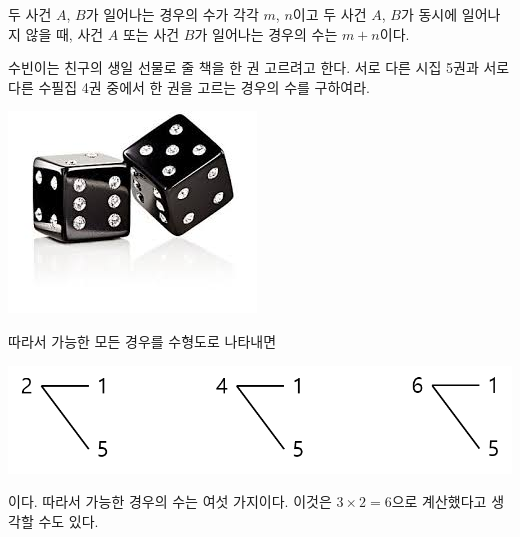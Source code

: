 \documentclass{oblivoir}
\begin{document}
\begin{mdframed}
%
\label{law2}
\hspace{-.7em}
두 사건 \(A\), \(B\)가 일어나는 경우의 수가 각각 \(m\), \(n\)이고 두 사건 \(A\), \(B\)가 동시에 일어나지 않을 때, 사건 \(A\) 또는 사건 \(B\)가 일어나는 경우의 수는 \(m+n\)이다.
\end{mdframed}

%
\prob{}\label{law3}
\hspace{-.7em}
수빈이는 친구의 생일 선물로 줄 책을 한 권 고르려고 한다.
서로 다른 시집 5권과 서로 다른 수필집 4권 중에서 한 권을 고르는 경우의 수를 구하여라.
\newpage

\noindent
\begin{minipage}{.8\textwidth}\label{law4}
%
\end{minipage}
\begin{minipage}{.2\textwidth}
\centering
\includegraphics[width=.9\textwidth]{dice2}
\end{minipage}
\begin{mdframed}
따라서 가능한 모든 경우를 수형도로 나타내면
\begin{center}
\includegraphics[width=.5\textwidth]{law_4}
\end{center}
이다.
따라서 가능한 경우의 수는 여섯 가지이다.
이것은 \(3\times2=6\)으로 계산했다고 생각할 수도 있다.
\end{mdframed}
\end{document}
